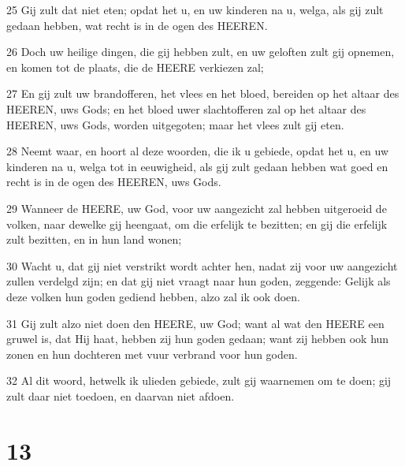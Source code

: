 \par 25 Gij zult dat niet eten; opdat het u, en uw kinderen na u, welga, als gij zult gedaan hebben, wat recht is in de ogen des HEEREN.
\par 26 Doch uw heilige dingen, die gij hebben zult, en uw geloften zult gij opnemen, en komen tot de plaats, die de HEERE verkiezen zal;
\par 27 En gij zult uw brandofferen, het vlees en het bloed, bereiden op het altaar des HEEREN, uws Gods; en het bloed uwer slachtofferen zal op het altaar des HEEREN, uws Gods, worden uitgegoten; maar het vlees zult gij eten.
\par 28 Neemt waar, en hoort al deze woorden, die ik u gebiede, opdat het u, en uw kinderen na u, welga tot in eeuwigheid, als gij zult gedaan hebben wat goed en recht is in de ogen des HEEREN, uws Gods.
\par 29 Wanneer de HEERE, uw God, voor uw aangezicht zal hebben uitgeroeid de volken, naar dewelke gij heengaat, om die erfelijk te bezitten; en gij die erfelijk zult bezitten, en in hun land wonen;
\par 30 Wacht u, dat gij niet verstrikt wordt achter hen, nadat zij voor uw aangezicht zullen verdelgd zijn; en dat gij niet vraagt naar hun goden, zeggende: Gelijk als deze volken hun goden gediend hebben, alzo zal ik ook doen.
\par 31 Gij zult alzo niet doen den HEERE, uw God; want al wat den HEERE een gruwel is, dat Hij haat, hebben zij hun goden gedaan; want zij hebben ook hun zonen en hun dochteren met vuur verbrand voor hun goden.
\par 32 Al dit woord, hetwelk ik ulieden gebiede, zult gij waarnemen om te doen; gij zult daar niet toedoen, en daarvan niet afdoen.

\chapter{13}

